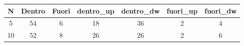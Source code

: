 \begin{tabular}{|c|c|c|c|c|c|c|}
\hline
\textbf{N}&\textbf{Dentro}&\textbf{Fuori}&\textbf{dentro_up}&\textbf{dentro_dw}&\textbf{fuori_up}&\textbf{fuori_dw}\\\hline
5&54&6&18&36&2&4\\\hline
10&52&8&26&26&2&6\\\hline
\end{tabular}
